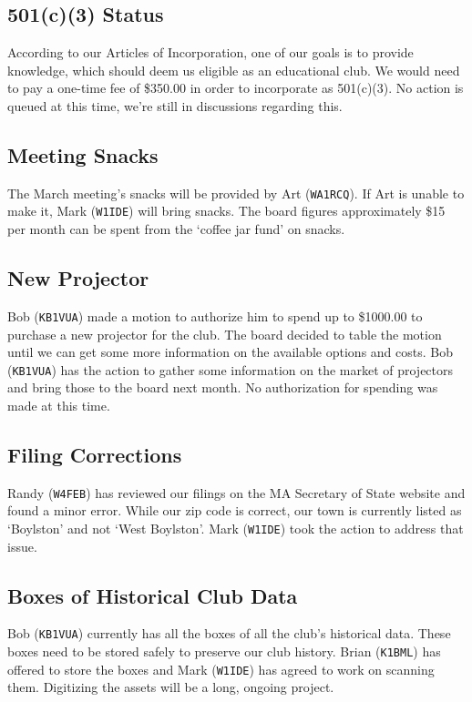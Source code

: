 \documentclass[10pt,letterpaper]{article}
\begin{document}
\subsection{501(c)(3) Status}
According to our Articles of Incorporation, one of our goals is to provide knowledge, which should deem us eligible as an educational club. We would need to pay a one-time fee of \$350.00 in order to incorporate as 501(c)(3). No action is queued at this time, we're still in discussions regarding this.

\subsection{Meeting Snacks}
The March meeting's snacks will be provided by Art (\texttt{WA1RCQ}). If Art is unable to make it, Mark (\texttt{W1IDE}) will bring snacks. The board figures approximately \$15 per month can be spent from the `coffee jar fund' on snacks.

\subsection{New Projector}
Bob (\texttt{KB1VUA}) made a motion to authorize him to spend up to \$1000.00 to purchase a new projector for the club. The board decided to table the motion until we can get some more information on the available options and costs. Bob (\texttt{KB1VUA}) has the action to gather some information on the market of projectors and bring those to the board next month. No authorization for spending was made at this time.

\subsection{Filing Corrections}
Randy (\texttt{W4FEB}) has reviewed our filings on the MA Secretary of State website and found a minor error. While our zip code is correct, our town is currently listed as `Boylston' and not `West Boylston'. Mark (\texttt{W1IDE}) took the action to address that issue.

\subsection{Boxes of Historical Club Data}
Bob (\texttt{KB1VUA}) currently has all the boxes of all the club's historical data. These boxes need to be stored safely to preserve our club history. Brian (\texttt{K1BML}) has offered to store the boxes and Mark (\texttt{W1IDE}) has agreed to work on scanning them. Digitizing the assets will be a long, ongoing project.
\end{document}
